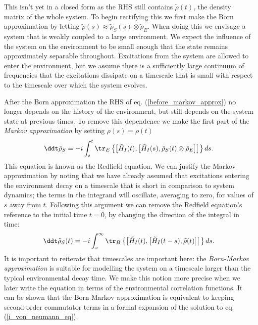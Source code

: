 This isn't yet in a closed form as the RHS still contains $\tilde{\rho}(t)$, the density matrix of the whole system. To begin rectifying this we first make the Born approximation by letting $\tilde{\rho}(s) \approx \tilde{\rho}_S(s) \otimes \tilde{\rho}_E$. When doing this we envisage a system that is weakly coupled to a large environment. We expect the influence of the system on the environment to be small enough that the state remains approximately separable throughout. Excitations from the system are allowed to enter the environment, but we assume there is a sufficiently large continuum of frequencies that the excitations dissipate on a timescale that is small with respect to the timescale over which the system evolves. 

After the Born approximation the RHS of eq. (\ref{before_markov_approx}) no longer depends on the history of the environment, but still depends on the system state at previous times. To remove this dependence we make the first part of the \textit{Markov approximation} by setting $\rho(s) = \rho(t)$
\begin{align}
  \ddt \tilde{\rho}_S = -i \int_{s}^t \tr_E\left\{\left[ \tilde{H}_I(t), \left[ \tilde{H}_I(s), \tilde{\rho}_S(t)\otimes\tilde{\rho}_E \right] \right]\right\} ds.
\end{align}
This equation is known as the Redfield equation. We can justify the Markov approximation by noting that we have already assumed that excitations entering the environment decay on a timescale that is short in comparison to system dynamics; the terms in the integrand will oscillate, averaging to zero, for values of $s$ away from $t$. Following this argument we can remove the Redfield equation's reference to the initial time $t=0$, by changing the direction of the integral in time:
\begin{align}
  \label{redfield_eq}
  \ddt \tilde{\rho}_S(t) = -i \int_{s}^\infty \tr_B\left\{\left[ \tilde{H}_I(t), \left[ \tilde{H}_I(t-s), \tilde{\rho}(t) \right] \right]\right\} ds.
\end{align}
It is important to reiterate that timescales are important here: the \textit{Born-Markov approximation} is suitable for modelling the system on a timescale larger than the typical environmental decay time. We make this notion more precise when we later write the equation in terms of the environmental correlation functions. It can be shown \cite{kok+lovett} that the Born-Markov approximation is equivalent to keeping second order commutator terms in a formal expansion of the solution to eq. (\ref{i_von_neumann_eq}).


